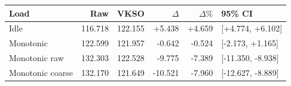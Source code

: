 \begin{tabular}{lrrrrl}
\toprule
Load & Raw & VKSO & $\Delta$ & $\Delta\%$ & 95\% CI \\
\midrule
Idle & 116.718 & 122.155 & +5.438 & +4.659 & [+4.774, +6.102] \\
Monotonic & 122.599 & 121.957 & -0.642 & -0.524 & [-2.173, +1.165] \\
Monotonic raw & 132.303 & 122.528 & -9.775 & -7.389 & [-11.350, -8.938] \\
Monotonic coarse & 132.170 & 121.649 & -10.521 & -7.960 & [-12.627, -8.889] \\
\bottomrule
\end{tabular}
